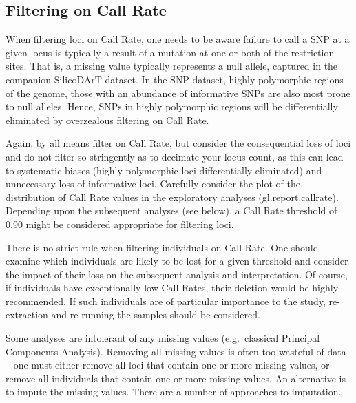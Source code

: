\documentclass[
  letterpaper,
  DIV=11,
  numbers=noendperiod]{scrreprt}
\begin{document}
\hypertarget{filtering-on-call-rate-1}{%
\subsection*{Filtering on Call Rate}\label{filtering-on-call-rate-1}}

When filtering loci on Call Rate, one needs to be aware failure to call
a SNP at a given locus is typically a result of a mutation at one or
both of the restriction sites. That is, a missing value typically
represents a null allele, captured in the companion SilicoDArT dataset.
In the SNP dataset, highly polymorphic regions of the genome, those with
an abundance of informative SNPs are also most prone to null alleles.
Hence, SNPs in highly polymorphic regions will be differentially
eliminated by overzealous filtering on Call Rate.

Again, by all means filter on Call Rate, but consider the consequential
loss of loci and do not filter so stringently as to decimate your locus
count, as this can lead to systematic biases (highly polymorphic loci
differentially eliminated) and unnecessary loss of informative loci.
Carefully consider the plot of the distribution of Call Rate values in
the exploratory analyses (gl.report.callrate). Depending upon the
subsequent analyses (see below), a Call Rate threshold of 0.90 might be
considered appropriate for filtering loci.

There is no strict rule when filtering individuals on Call Rate. One
should examine which individuals are likely to be lost for a given
threshold and consider the impact of their loss on the subsequent
analysis and interpretation. Of course, if individuals have
exceptionally low Call Rates, their deletion would be highly
recommended. If such individuals are of particular importance to the
study, re-extraction and re-running the samples should be considered.

Some analyses are intolerant of any missing values (e.g.~classical
Principal Components Analysis). Removing all missing values is often too
wasteful of data -- one must either remove all loci that contain one or
more missing values, or remove all individuals that contain one or more
missing values. An alternative is to impute the missing values. There
are a number of approaches to imputation.
\end{document}
